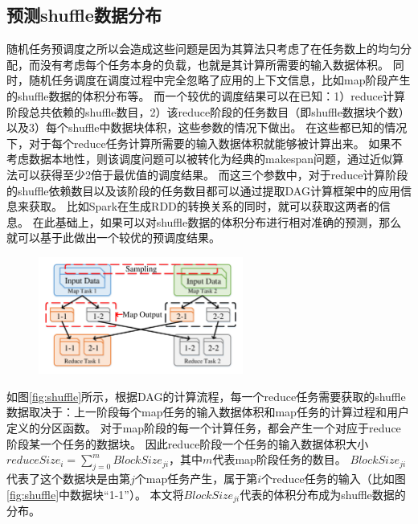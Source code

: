 \subsection{预测shuffle数据分布}

随机任务预调度之所以会造成这些问题是因为其算法只考虑了在任务数上的均匀分配，而没有考虑每个任务本身的负载，也就是其计算所需要的输入数据体积。
同时，随机任务调度在调度过程中完全忽略了应用的上下文信息，比如map阶段产生的shuffle数据的体积分布等。
而一个较优的调度结果可以在已知：1）reduce计算阶段总共依赖的shuffle数目，2）该reduce阶段的任务数目（即shuffle数据块个数）以及3）每个shuffle中数据块体积，这些参数的情况下做出。
在这些都已知的情况下，对于每个reduce任务计算所需要的输入数据体积就能够被计算出来。
如果不考虑数据本地性，则该调度问题可以被转化为经典的makespan问题，通过近似算法可以获得至少2倍于最优值的调度结果\cite{approximation}。
而这三个参数中，对于reduce计算阶段的shuffle依赖数目以及该阶段的任务数目都可以通过提取DAG计算框架中的应用信息来获取。
比如Spark在生成RDD的转换关系的同时，就可以获取这两者的信息\cite{spark}。
在此基础上，如果可以对shuffle数据的体积分布进行相对准确的预测，那么就可以基于此做出一个较优的预调度结果。

\begin{figure}[!htp]
	\centering
	\includegraphics[width=0.6\textwidth]{../../PPoPP-2018/fig/shuffle.pdf}
\end{figure}

如图\ref{fig:shuffle}所示，根据DAG的计算流程，每一个reduce任务需要获取的shuffle数据取决于：上一阶段每个map任务的输入数据体积和map任务的计算过程和用户定义的分区函数。
对于map阶段的每一个计算任务，都会产生一个对应于reduce阶段某一个任务的数据块。
因此reduce阶段一个任务的输入数据体积大小$reduceSize_i = \sum_{j=0}^{m} {BlockSize_{ji}}$，其中$m$代表map阶段任务的数目。
$BlockSize_{ji}$代表了这个数据块是由第$j$个map任务产生，属于第$i$个reduce任务的输入（比如图\ref{fig:shuffle}中数据块“1-1”）。
本文将$BlockSize_{ji}$代表的体积分布成为shuffle数据的分布。

